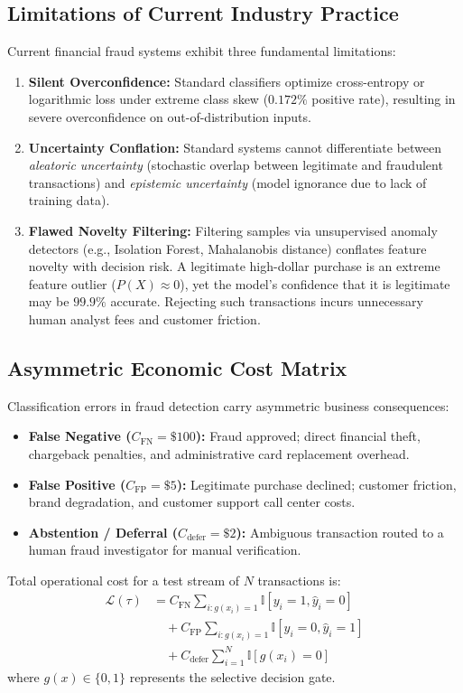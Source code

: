 \documentclass[10pt,a4paper,twocolumn]{article}
\begin{document}
\subsection{Limitations of Current Industry Practice}
Current financial fraud systems exhibit three fundamental limitations:
\begin{enumerate}
  \item \textbf{Silent Overconfidence:} Standard classifiers optimize cross-entropy or logarithmic loss under extreme class skew ($0.172\%$ positive rate), resulting in severe overconfidence on out-of-distribution inputs.
  \item \textbf{Uncertainty Conflation:} Standard systems cannot differentiate between \textit{aleatoric uncertainty} (stochastic overlap between legitimate and fraudulent transactions) and \textit{epistemic uncertainty} (model ignorance due to lack of training data).
  \item \textbf{Flawed Novelty Filtering:} Filtering samples via unsupervised anomaly detectors (e.g., Isolation Forest, Mahalanobis distance) conflates feature novelty with decision risk. A legitimate high-dollar purchase is an extreme feature outlier ($P(X) \approx 0$), yet the model's confidence that it is legitimate may be $99.9\%$ accurate. Rejecting such transactions incurs unnecessary human analyst fees and customer friction.
\end{enumerate}

\subsection{Asymmetric Economic Cost Matrix}
Classification errors in fraud detection carry asymmetric business consequences:
\begin{itemize}
  \item \textbf{False Negative ($C_{\text{FN}} = \$100$):} Fraud approved; direct financial theft, chargeback penalties, and administrative card replacement overhead.
  \item \textbf{False Positive ($C_{\text{FP}} = \$5$):} Legitimate purchase declined; customer friction, brand degradation, and customer support call center costs.
  \item \textbf{Abstention / Deferral ($C_{\text{defer}} = \$2$):} Ambiguous transaction routed to a human fraud investigator for manual verification.
\end{itemize}
Total operational cost for a test stream of $N$ transactions is:
\begin{align}
  \mathcal{L}(\tau) &= C_{\text{FN}} \sum_{i: g(x_i)=1} \mathbb{I}[y_i = 1, \hat{y}_i = 0] \nonumber \\
  &\quad + C_{\text{FP}} \sum_{i: g(x_i)=1} \mathbb{I}[y_i = 0, \hat{y}_i = 1] \nonumber \\
  &\quad + C_{\text{defer}} \sum_{i=1}^N \mathbb{I}[g(x_i)=0]
\end{align}
where $g(x) \in \{0, 1\}$ represents the selective decision gate.
\end{document}
